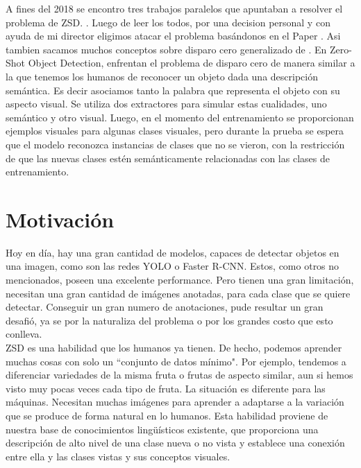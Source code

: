 A fines del 2018 se encontro tres trabajos paralelos que apuntaban a resolver el problema de ZSD. \cite{rahman2018zero} \cite{zhu2018zero} \cite{bansal2018zero}. Luego de leer los todos, por una decision personal y con ayuda de mi director eligimos atacar el problema basándonos en el Paper \cite{bansal2018zero}. Asi tambien sacamos muchos conceptos sobre disparo cero generalizado de \cite{zero-shot-generalizado}. En Zero-Shot Object Detection\cite{bansal2018zero}, enfrentan el problema de disparo cero de manera similar a la que tenemos los humanos de reconocer un objeto dada una descripción semántica. Es decir asociamos tanto la palabra que representa el objeto con su aspecto visual. Se utiliza dos extractores para simular estas cualidades, uno semántico y otro visual. Luego, en el momento del entrenamiento se proporcionan ejemplos visuales para algunas clases visuales, pero durante la prueba se espera que el modelo reconozca instancias de clases que no se vieron, con la restricción de que las nuevas clases estén semánticamente relacionadas con las clases de entrenamiento.\\



\section{Motivación}

Hoy en día, hay una gran cantidad de modelos, capaces de detectar objetos en una imagen, como son las redes YOLO o Faster R-CNN. Estos, como otros no mencionados, poseen una excelente performance. Pero tienen una gran limitación, necesitan una gran cantidad de imágenes anotadas, para cada clase que se quiere detectar. Conseguir un gran numero de anotaciones, pude resultar un gran desafió, ya se por la naturaliza del problema o por los grandes costo que esto conlleva.\\ 

ZSD es una habilidad que los humanos ya tienen. De hecho, podemos aprender muchas cosas con solo un ``conjunto de datos mínimo". Por ejemplo, tendemos a diferenciar  variedades de la misma fruta o frutas de aspecto similar, aun si hemos visto muy pocas veces cada tipo de fruta. La situación es diferente para las máquinas. Necesitan muchas imágenes para aprender a adaptarse a la variación que se produce de forma natural en lo humanos. Esta habilidad proviene de nuestra base de conocimientos lingüísticos existente, que proporciona una descripción de alto nivel de una clase nueva o no vista y establece una conexión entre ella y las clases vistas y sus conceptos visuales.\\

